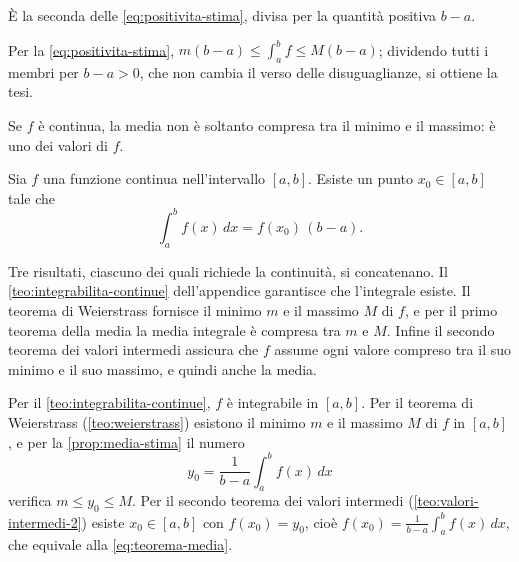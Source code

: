 \begin{strategia}
È la seconda delle \eqref{eq:positivita-stima}, divisa per la quantità positiva
$b-a$.
\end{strategia}

\begin{dimostrazione}
Per la \eqref{eq:positivita-stima}, $m(b-a)\le\int_{a}^{b}f\le M(b-a)$; dividendo tutti i
membri per $b-a>0$, che non cambia il verso delle disuguaglianze, si ottiene la tesi.
\end{dimostrazione}

Se $f$ è continua, la media non è soltanto compresa tra il minimo e il massimo:
è uno dei valori di $f$.

\begin{teorema}\label{teo:media}
Sia $f$ una funzione continua nell'intervallo $[a,b]$. Esiste un punto
$x_{0}\in[a,b]$ tale che
\begin{equation}\label{eq:teorema-media}
  \int_{a}^{b}f(x)\,dx=f(x_{0})\,(b-a) .
\end{equation}
\end{teorema}

\begin{schema}
\end{schema}

\begin{strategia}
Tre risultati, ciascuno dei quali richiede la continuità, si concatenano. Il
\cref{teo:integrabilita-continue} dell'appendice garantisce che l'integrale esiste. Il
teorema di Weierstrass fornisce il minimo $m$ e il massimo $M$ di $f$, e per il primo
teorema della media la media integrale è compresa tra $m$ e $M$. Infine il secondo
teorema dei valori intermedi assicura che $f$ assume ogni valore compreso tra il suo
minimo e il suo massimo, e quindi anche la media.
\end{strategia}

\begin{dimostrazione}
Per il \cref{teo:integrabilita-continue}, $f$ è integrabile in $[a,b]$. Per il teorema
di Weierstrass (\cref{teo:weierstrass}) esistono il minimo $m$ e il massimo $M$ di $f$ in
$[a,b]$, e per la \cref{prop:media-stima} il numero
\[
  y_{0}=\frac1{b-a}\int_{a}^{b}f(x)\,dx
\]
verifica $m\le y_{0}\le M$. Per il secondo teorema dei valori intermedi
(\cref{teo:valori-intermedi-2}) esiste $x_{0}\in[a,b]$ con $f(x_{0})=y_{0}$, cioè
$f(x_{0})=\frac1{b-a}\int_{a}^{b}f(x)\,dx$, che equivale alla \eqref{eq:teorema-media}.
\end{dimostrazione}

